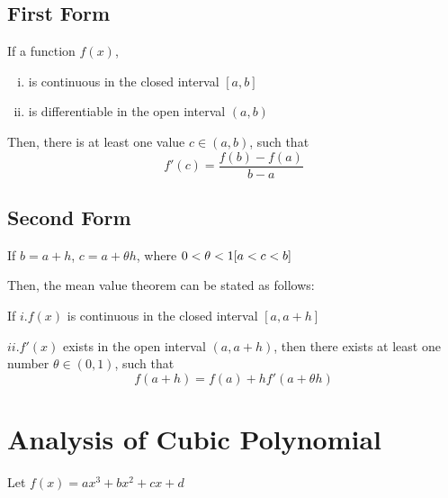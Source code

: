 \documentclass{article}
\begin{document}
\subsection*{First Form}
If a function $f(x)$, \begin{enumerate}[i.]
    \item is continuous in the closed interval $[a,b]$
    \item is differentiable in the open interval $(a,b)$
\end{enumerate} Then, there is at least one value $c \in (a,b)$, such that $$f'(c)=\dfrac{f(b)-f(a)}{b-a}$$
\subsection*{Second Form}
If $b=a+h$, $c=a + \theta h$, where $0<\theta <1 \hfill [a<c<b]$

Then, the mean value theorem can be stated as follows:

If $i. f(x)$ is continuous in the closed interval $[a,a+h]$

$ii. f'(x)$ exists in the open interval $(a,a+h)$, then there exists at least one number $\theta \in (0,1)$, such that $$f(a+h)=f(a)+hf'(a+\theta h)$$

\section{Analysis of Cubic Polynomial}
Let $f(x)=ax^3+bx^2+cx+d$
\end{document}
